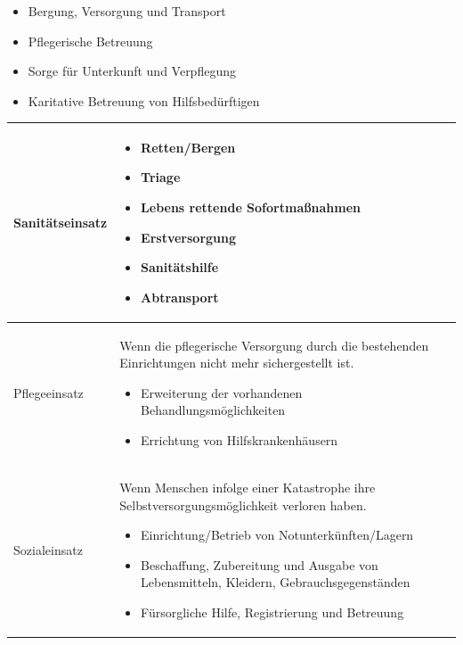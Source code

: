 \documentclass{article}
\begin{document}
\begin{itemize}
\item {\mdseries
Bergung, Versorgung und Transport }

\item {\mdseries
Pflegerische Betreuung }

\item {\mdseries
Sorge f\"ur Unterkunft und Verpflegung }

\item {\mdseries
Karitative Betreuung von Hilfsbed\"urftigen}

\end{itemize}
\begin{center}
\tablehead{}\begin{supertabular}{|m{6.649cm}|m{6.651cm}|}
\hline
{\mdseries\color{black} Sanit\"atseinsatz}

 &
\begin{itemize}
\item {\mdseries Retten/Bergen}

\item {\mdseries Triage}

\item {\mdseries Lebens rettende Sofortma{\ss}nahmen}

\item {\mdseries Erstversorgung}

\item {\mdseries Sanit\"atshilfe}

\item Abtransport

\end{itemize}
\\\hline
{\mdseries\color{black} Pflegeeinsatz}

 &
{\mdseries Wenn die pflegerische Versorgung durch die bestehenden
Einrichtungen nicht mehr sichergestellt ist.}

\begin{itemize}
\item {\mdseries Erweiterung der vorhandenen Behandlungsm\"oglichkeiten}

\item Errichtung von Hilfskrankenh\"ausern

\end{itemize}
\\\hline
{\mdseries\color{black} Sozialeinsatz}

 &
{\mdseries Wenn Menschen infolge einer Katastrophe ihre
Selbstversorgungsm\"oglichkeit verloren haben.}

\begin{itemize}
\item {\mdseries Einrichtung/Betrieb von Notunterk\"unften/Lagern  }

\item {\mdseries Beschaffung, Zubereitung und Ausgabe von Lebensmitteln,
Kleidern, Gebrauchsgegenst\"anden  }

\item F\"ursorgliche Hilfe, Registrierung und Betreuung

\end{itemize}
\\\hline
\end{supertabular}
\end{center}
\end{document}

